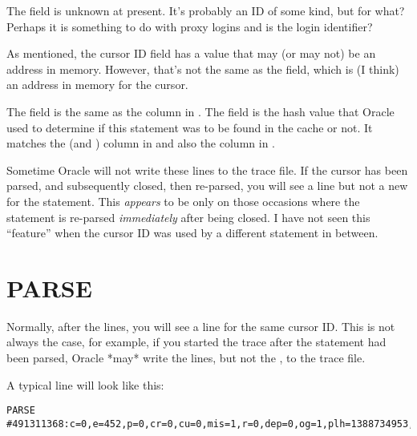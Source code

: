 The  field is unknown at present. It's probably an ID of some kind, but for what? Perhaps it is something to do with proxy logins and  is the login identifier?

As mentioned, the cursor ID field has a value that may (or may not) be an address in memory. However, that's not the same as the  field, which is (I think) an address in memory for the cursor.

The  field is the same as the  column in . The  field is the hash value that Oracle used to determine if this statement was to be found in the cache or not. It matches the  (and ) column in  and also the  column in .

Sometime Oracle will not write these lines to the trace file. If the cursor has been parsed, and subsequently closed, then re-parsed, you will see a  line but not a new  for the statement. This \emph{appears} to be only on those occasions where the statement is re-parsed \emph{immediately} after being closed. I have not seen this ``feature'' when the cursor ID was used by a different statement in between.

\newpage\section{PARSE}\label{parse}

Normally, after the  lines, you will see a  line for the same cursor ID. This is not always the case, for example, if you started the trace after the statement had been parsed, Oracle *may* write the  lines, but not the , to the trace file.

A typical  line will look like this:

\begin{lstlisting}[numbers=none,caption={Parse Line}]
PARSE #491311368:c=0,e=452,p=0,cr=0,cu=0,mis=1,r=0,dep=0,og=1,plh=1388734953,tim=97734887542
\end{lstlisting}

